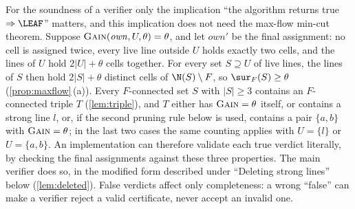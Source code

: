 
\begin{remark}\label{rem:true-cert}
For the soundness of a verifier only the implication ``the algorithm returns true $\Rightarrow\LEAF$''
matters, and this implication does not need the max-flow min-cut theorem. Suppose
$\textsc{Gain}(\mathit{own},U,\theta)=\theta$, and let $\mathit{own}'$ be the final assignment: no cell is
assigned twice, every live line outside $U$ holds exactly two cells, and the lines of $U$ hold $2|U|+\theta$
cells together. For every set $S\supseteq U$ of live lines, the lines of $S$ then hold $2|S|+\theta$
distinct cells of $\N(S)\setminus F$, so $\sur_F(S)\ge\theta$ (\cref{prop:maxflow}\,(a)). Every $F$-connected
set $S$ with $|S|\ge3$ contains an $F$-connected triple $T$ (\cref{lem:triple}), and $T$ either has
$\textsc{Gain}=\theta$ itself, or contains a strong line $l$, or, if the second pruning rule below is
used, contains a pair $\{a,b\}$ with $\textsc{Gain}=\theta$; in the last two cases the same counting
applies with $U=\{l\}$ or $U=\{a,b\}$. An implementation can therefore validate each true verdict
literally, by checking the final assignments against these three properties. The main verifier does
so, in the modified form described under ``Deleting strong lines'' below (\cref{lem:deleted}). False
verdicts affect only completeness: a wrong ``false'' can make a verifier reject a valid certificate,
never accept an invalid one.
\end{remark}



